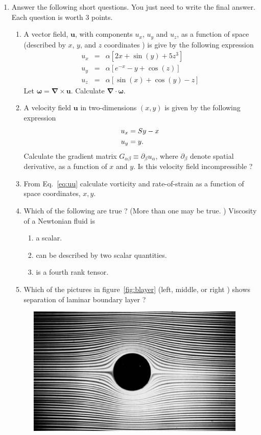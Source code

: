 \documentclass[12pt,a4paper]{article}
\def \oo {\bm{\omega}}
\def \curl {\bm{\nabla}\times}
\def \dive {\bm{\nabla}\cdot}
\newcommand{\bu}{\bm{u}}
\begin{document}
\begin{enumerate}

\item \label{prb1} Answer the following short questions. You just need to write the final answer. Each question is worth 3 points. 
  \begin{enumerate}
  \item A vector field, $\bu$, with components $u_x$, $u_y$ and $u_z$,  as a function  of
    space (described by $x$, $y$, and $z$ coordinates )
    is give by the following expression
    \begin{eqnarray}
      u_x &=& \alpha [2x + \sin(y) + 5z^3 ] \nonumber \\
      u_y &=& \alpha[ e^{-x} - y + \cos(z) ] \nonumber \\
      u_z &=& \alpha[ \sin(x) + \cos(y) -z ]
    \end{eqnarray}
   Let $\oo = \curl \bu$. Calculate $\dive \oo$. 
 \item A velocity field $\bu$ in two-dimensions $(x,y)$ is given by the following expression
   \begin{subequations}
     \begin{align}
     u_x &= Sy -x \\
     u_y &= y  \/.
     \end{align}
     \label{eq:uu}
   \end{subequations}
   Calculate the gradient matrix $ G_{\alpha\beta} \equiv \partial_{\beta}u_{\alpha}$, where
   $\partial_{\beta}$ denote spatial derivative, as a function of $x$ and $y$. Is this velocity
   field incompressible ? 
 \item From Eq.~\ref{eq:uu}  calculate vorticity and rate-of-strain as a function of
   space coordinates, $x,y$.
 \item Which of the following are true ? (More than one may be true. )
   Viscosity of a Newtonian fluid is
   \begin{enumerate}
   \item a scalar.
   \item can be described by two scalar quantities.
     \item is a fourth rank tensor. 
    \end{enumerate}
 \item Which of the pictures in figure~\ref{fig:blayer} (left, middle, or right ) shows separation
   of laminar boundary layer ?
  \end{enumerate}
  \begin{figure}
    \includegraphics[width=0.3\linewidth]{b1.JPG}

\end{figure}
\end{enumerate}
\end{document}
